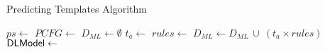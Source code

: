 \begin{algorithm}[t]
    \caption{Predicting Templates Algorithm}
    \label{algo:predict-algo}
    \renewcommand{\algorithmicrequire}{\textbf{Input:}}
    \renewcommand{\algorithmicensure}{\textbf{Output:}}
    \begin{algorithmic}[1]
    \State $ps \gets$ 
    \State $PCFG \gets$ 
    \State $D_{ML} \gets \emptyset$
      \State $t_a \gets$ 
      \State $rules \gets$ 
      \State $D_{ML} \gets D_{ML}\,\cup\ (t_a \times rules)$
    \EndFor
    \State $\mathsf{DLModel} \gets$ 
    \State \Return{$\Model$}
    \EndProcedure
    \end{algorithmic}
\end{algorithm}
